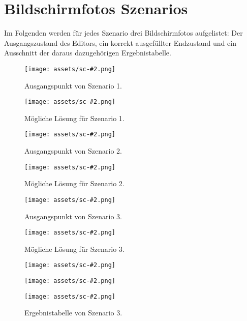 \chapter{Bildschirmfotos Szenarios}
\label{app:scenarios}

Im Folgenden werden für jedes Szenario drei Bildschirmfotos aufgelistet: Der Ausgangszustand des Editors, ein korrekt ausgefüllter Endzustand und ein Ausschnitt der daraus dazugehörigen Ergebnistabelle.

\newcommand{\scgraphic}[3][]{%
  \texttt{[image: assets/sc-\#2.png]}
  #1
  \caption[#3]{#3.}}

\newcommand{\cscgraphic}[2]{%
  \scgraphic[\vspace{-10mm}]{#1}{#2}}

\newcommand{\scfigure}[2]{%
  \begin{figure}[hbtp]
    \centering
    \scgraphic{#1}{#2}
  \end{figure}}

\scfigure{1-start}{Ausgangspunkt von Szenario 1}
\scfigure{1-end}{Mögliche Lösung für Szenario 1}
\scfigure{2-start}{Ausgangspunkt von Szenario 2}
\scfigure{2-end}{Mögliche Lösung für Szenario 2}
\scfigure{3-start}{Ausgangspunkt von Szenario 3}
\scfigure{3-end}{Mögliche Lösung für Szenario 3}
\begin{figure}[hbtp]
  \centering
  \cscgraphic{1-result}{Ergebnistabelle von Szenario 1}
  \vspace{4mm}
  \cscgraphic{2-result}{Ergebnistabelle von Szenario 2}
  \vspace{4mm}
  \cscgraphic{3-result}{Ergebnistabelle von Szenario 3}
\end{figure}
